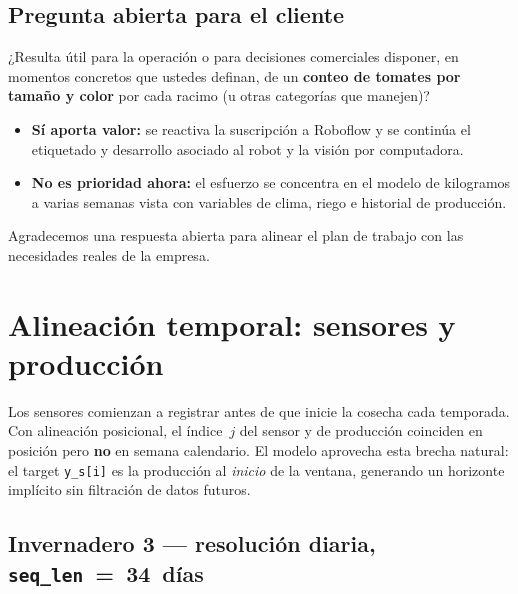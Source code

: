 \documentclass[11pt,a4paper]{article}
\begin{document}
\subsection{Pregunta abierta para el cliente}

\begin{infobox}
¿Resulta útil para la operación o para decisiones comerciales disponer, en momentos concretos que ustedes definan, de un \textbf{conteo de tomates por tamaño y color} por cada racimo (u otras categorías que manejen)?

\begin{itemize}
  \item \textbf{Sí aporta valor:} se reactiva la suscripción a Roboflow y se continúa el etiquetado y desarrollo asociado al robot y la visión por computadora.
  \item \textbf{No es prioridad ahora:} el esfuerzo se concentra en el modelo de kilogramos a varias semanas vista con variables de clima, riego e historial de producción.
\end{itemize}

Agradecemos una respuesta abierta para alinear el plan de trabajo con las necesidades reales de la empresa.
\end{infobox}

\section{Alineación temporal: sensores y producción}

Los sensores comienzan a registrar antes de que inicie la cosecha cada temporada.
Con alineación posicional, el índice~$j$ del sensor y de producción coinciden en
posición pero \textbf{no} en semana calendario.
El modelo aprovecha esta brecha natural: el target \texttt{y\_s[i]} es la
producción al \emph{inicio} de la ventana, generando un horizonte implícito sin
filtración de datos futuros.

\subsection*{Invernadero 3 — resolución diaria, \texttt{seq\_len}~=~34~días}
\end{document}
